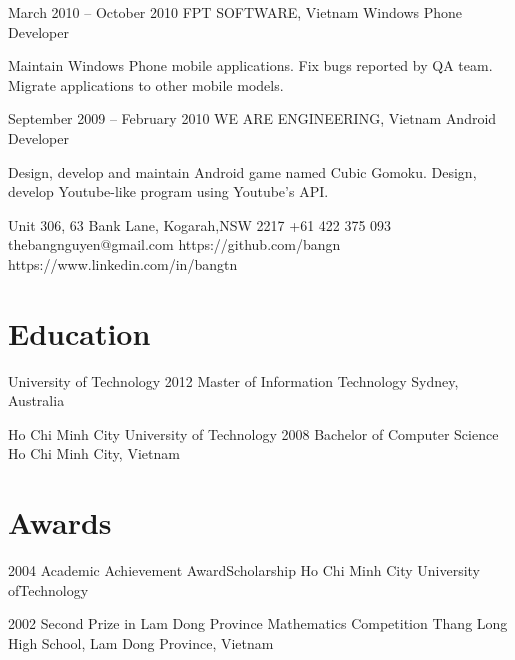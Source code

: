 \documentclass{tccv}
\begin{document}
\begin{eventlist}
\item{March 2010 -- October 2010}
     {FPT SOFTWARE, Vietnam}
     {Windows Phone Developer}

Maintain Windows Phone mobile applications.
Fix bugs reported by QA team.
Migrate applications to other mobile models.

\item{September 2009 -- February 2010}
     {WE ARE ENGINEERING, Vietnam}
     {Android Developer}

Design, develop and maintain Android game named Cubic Gomoku.
Design, develop Youtube-like program using Youtube's API.

\end{eventlist}

\personal
    {Unit 306, 63 Bank Lane, Kogarah,\newline NSW 2217}
    {+61 422 375 093}
    {thebangnguyen@gmail.com}
    {https://github.com/bangn}
    {https://www.linkedin.com/in/bangtn}
        
\section{Education}

\begin{yearlist}

\item[University of Technology]{2012}
     {Master of Information Technology}
     {Sydney, Australia}

\item[Ho Chi Minh City University of Technology]{2008}
     {Bachelor of Computer Science}
     {Ho Chi Minh City, Vietnam}

\end{yearlist}

\section{Awards}

\begin{yearlist}

\item{2004}
     {Academic Achievement Award\newline Scholarship}
     {Ho Chi Minh City University of\newline Technology}

\item{2002}
     {Second Prize in Lam Dong Province Mathematics Competition}
     {Thang Long High School, Lam Dong Province, Vietnam}

\end{yearlist}
\end{document}
